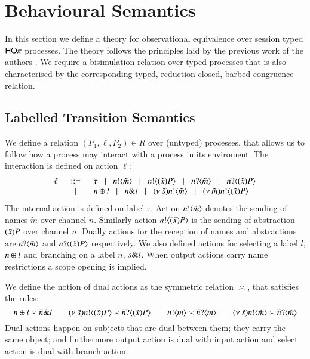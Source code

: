 \section{Behavioural Semantics}
\label{sec:beh_sem}

In this section we define a theory for observational equivalence over
session typed $\mathsf{HO}\pi$ processes. The theory follows the principles
laid by the previous work of the authors
\cite{DBLP:conf/forte/KouzapasYH11,KY13,dkphdthesis}.
We require a bisimulation relation over typed processes that
is also characterised by the corresponding typed, reduction-closed,
barbed congruence relation.


\subsection{Labelled Transition Semantics}

We define a relation $(P_1, \ell, P_2) \in R$ over
(untyped) processes, that allows us to follow how a process may
interact with a process in its enviroment. The interaction
is defined on action $\ell$:
%
\[
\begin{array}{rcl}
		\ell	& \;\;::=\;\;  & \tau \;\;\;|\;\;\; n ! \langle \tilde{m} \rangle \;\;\;|\;\;\; n ! \langle (\tilde{x})P \rangle \;\;\;|\;\;\;n ? \langle \tilde{m} \rangle \;\;\;|\;\;\; n ? \langle (\tilde{x})P \rangle \\
			& \;\;\;|\;\;\; & n \oplus l \;\;\;|\;\;\; n \& l \;\;\;|\;\;\; (\nu\ \tilde{s}) n ! \langle \tilde{m} \rangle \;\;\;|\;\;\; (\nu\ \tilde{m}) n ! \langle (\tilde{x})P \rangle
\end{array}
\]
%
\noi The internal action is defined on label $\tau$.
Action $n ! \langle \tilde{m} \rangle$ denotes the sending of names $\tilde{m}$ over channel $n$.
Similarly action $n ! \langle (\tilde{x})P \rangle$ is the sending of abstraction $(\tilde{x})P$
over channel $n$. Dually actions for the reception of names and abstractions are
$n ? \langle \tilde{m} \rangle$ and $n ? \langle (\tilde{x})P \rangle$ respectively. We also defined
actions for selecting a label $l$, $n \oplus l$ and branching on a label
$n$, $s \& l$. When output actions carry name restrictions a scope
opening is implied.

We define the notion of dual actions as the symmetric relation $\asymp$, that satisfies the rules:
%
\[
	n \oplus l \asymp \overline{n} \& l
	\qquad
	(\nu\ \tilde{s}) n ! \langle (\tilde{x})P \rangle \asymp \overline{n} ? \langle (\tilde{x})P \rangle
	\qquad
	n ! \langle m \rangle \asymp \overline{n} ? \langle m \rangle
	\qquad
	(\nu\ \tilde{s}) n ! \langle \tilde{m} \rangle \asymp \overline{n} ? \langle \tilde{m} \rangle
\]
%
Dual actions happen on subjects that are dual between them; they carry the same
object; and furthermore output action is dual with input action and 
select action is dual with branch action.


